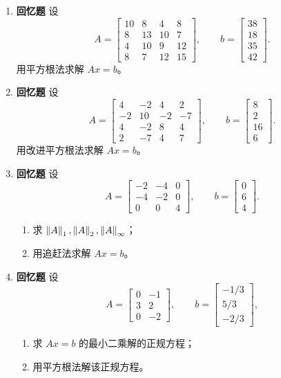 \documentclass{article}
\newcommand{\oldtag}{\textcolor{red!65!black}{\textbf{回忆题}}}
\begin{document}
\begin{enumerate}
  \item \oldtag{} 设
  \[
    A=\begin{bmatrix}
      10&8&4&8\\
      8&13&10&7\\
      4&10&9&12\\
      8&7&12&15
    \end{bmatrix},\qquad
    b=\begin{bmatrix}38\\18\\35\\42\end{bmatrix}.
  \]
  用平方根法求解 $Ax=b$。

  \item \oldtag{} 设
  \[
    A=\begin{bmatrix}
      4&-2&4&2\\
      -2&10&-2&-7\\
      4&-2&8&4\\
      2&-7&4&7
    \end{bmatrix},\qquad
    b=\begin{bmatrix}8\\2\\16\\6\end{bmatrix}.
  \]
  用改进平方根法求解 $Ax=b$。

  \item \oldtag{} 设
  \[
    A=\begin{bmatrix}-2&-4&0\\-4&-2&0\\0&0&4\end{bmatrix},\qquad
    b=\begin{bmatrix}0\\6\\4\end{bmatrix}.
  \]
  \begin{enumerate}[(1)]
    \item 求 $\left\| A \right\|_1,\left\| A \right\|_2,\left\| A \right\|_\infty$；
    \item 用追赶法求解 $Ax=b$。
  \end{enumerate}

  \item \oldtag{} 设
  \[
    A=\begin{bmatrix}0&-1\\3&2\\0&-2\end{bmatrix},\qquad
    b=\begin{bmatrix}-1/3\\5/3\\-2/3\end{bmatrix},
  \]
  \begin{enumerate}[(1)]
    \item 求 $Ax=b$ 的最小二乘解的正规方程；
    \item 用平方根法解该正规方程。
  \end{enumerate}
\end{enumerate}
\end{document}
